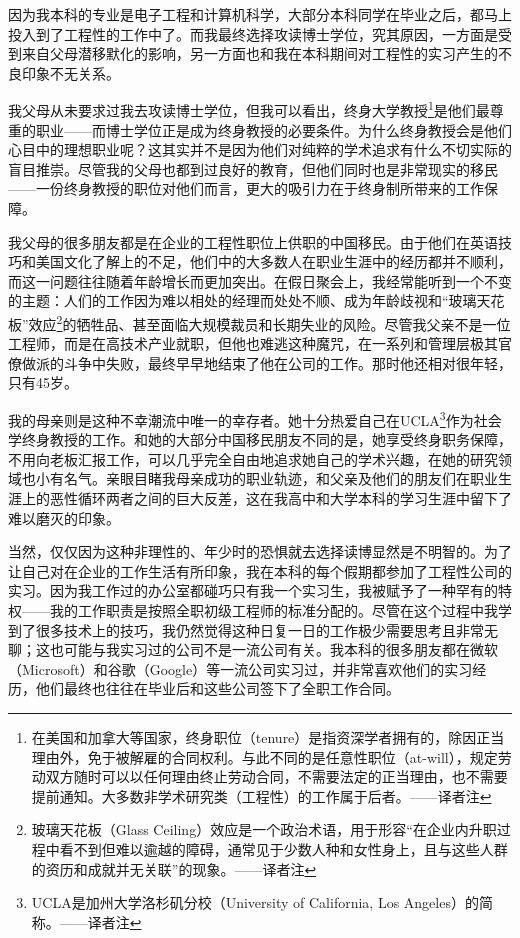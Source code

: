 \documentclass[letter,12pt]{book}
\begin{document}
\begin{CJK}{UTF8}{gbsn}


\mainmatter



因为我本科的专业是电子工程和计算机科学，大部分本科同学在毕业之后，都马上投入到了工程性的工作中了。而我最终选择攻读博士学位，究其原因，一方面是受到来自父母潜移默化的影响，另一方面也和我在本科期间对工程性的实习产生的不良印象不无关系。

我父母从未要求过我去攻读博士学位，但我可以看出，终身大学教授\footnote{在美国和加拿大等国家，终身职位（tenure）是指资深学者拥有的，除因正当理由外，免于被解雇的合同权利。与此不同的是任意性职位（at-will），规定劳动双方随时可以以任何理由终止劳动合同，不需要法定的正当理由，也不需要提前通知。大多数非学术研究类（工程性）的工作属于后者。——译者注}是他们最尊重的职业——而博士学位正是成为终身教授的必要条件。为什么终身教授会是他们心目中的理想职业呢？这其实并不是因为他们对纯粹的学术追求有什么不切实际的盲目推崇。尽管我的父母也都到过良好的教育，但他们同时也是非常现实的移民——一份终身教授的职位对他们而言，更大的吸引力在于终身制所带来的工作保障。

我父母的很多朋友都是在企业的工程性职位上供职的中国移民。由于他们在英语技巧和美国文化了解上的不足，他们中的大多数人在职业生涯中的经历都并不顺利，而这一问题往往随着年龄增长而更加突出。在假日聚会上，我经常能听到一个不变的主题：人们的工作因为难以相处的经理而处处不顺、成为年龄歧视和“玻璃天花板”效应\footnote{玻璃天花板（Glass Ceiling）效应是一个政治术语，用于形容“在企业内升职过程中看不到但难以逾越的障碍，通常见于少数人种和女性身上，且与这些人群的资历和成就并无关联”的现象。——译者注}的牺牲品、甚至面临大规模裁员和长期失业的风险。尽管我父亲不是一位工程师，而是在高技术产业就职，但他也难逃这种魔咒，在一系列和管理层极其官僚做派的斗争中失败，最终早早地结束了他在公司的工作。那时他还相对很年轻，只有45岁。

我的母亲则是这种不幸潮流中唯一的幸存者。她十分热爱自己在UCLA\footnote{UCLA是加州大学洛杉矶分校（University of California, Los Angeles）的简称。——译者注}作为社会学终身教授的工作。和她的大部分中国移民朋友不同的是，她享受终身职务保障，不用向老板汇报工作，可以几乎完全自由地追求她自己的学术兴趣，在她的研究领域也小有名气。亲眼目睹我母亲成功的职业轨迹，和父亲及他们的朋友们在职业生涯上的恶性循环两者之间的巨大反差，这在我高中和大学本科的学习生涯中留下了难以磨灭的印象。

当然，仅仅因为这种非理性的、年少时的恐惧就去选择读博显然是不明智的。为了让自己对在企业的工作生活有所印象，我在本科的每个假期都参加了工程性公司的实习。因为我工作过的办公室都碰巧只有我一个实习生，我被赋予了一种罕有的特权——我的工作职责是按照全职初级工程师的标准分配的。尽管在这个过程中我学到了很多技术上的技巧，我仍然觉得这种日复一日的工作极少需要思考且非常无聊；这也可能与我实习过的公司不是一流公司有关。我本科的很多朋友都在微软（Microsoft）和谷歌（Google）等一流公司实习过，并非常喜欢他们的实习经历，他们最终也往往在毕业后和这些公司签下了全职工作合同。


\end{CJK}
\end{document}
